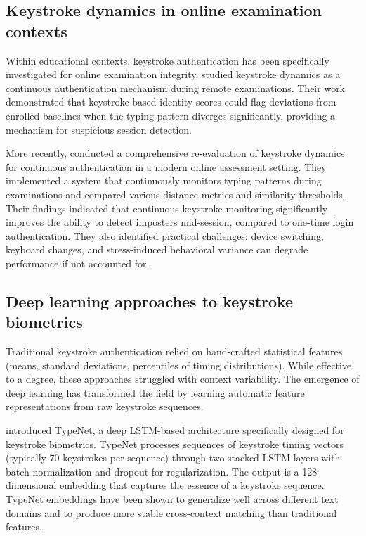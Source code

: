 \subsection{Keystroke dynamics in online examination contexts}

Within educational contexts, keystroke authentication has been specifically investigated for online examination integrity. \citet{mattsson2020keystroke} studied keystroke dynamics as a continuous authentication mechanism during remote examinations. Their work demonstrated that keystroke-based identity scores could flag deviations from enrolled baselines when the typing pattern diverges significantly, providing a mechanism for suspicious session detection.

More recently, \citet{senarath2023reevaluating} conducted a comprehensive re-evaluation of keystroke dynamics for continuous authentication in a modern online assessment setting. They implemented a system that continuously monitors typing patterns during examinations and compared various distance metrics and similarity thresholds. Their findings indicated that continuous keystroke monitoring significantly improves the ability to detect imposters mid-session, compared to one-time login authentication. They also identified practical challenges: device switching, keyboard changes, and stress-induced behavioral variance can degrade performance if not accounted for.

\subsection{Deep learning approaches to keystroke biometrics}

Traditional keystroke authentication relied on hand-crafted statistical features (means, standard deviations, percentiles of timing distributions). While effective to a degree, these approaches struggled with context variability. The emergence of deep learning has transformed the field by learning automatic feature representations from raw keystroke sequences.

\citet{acien2022typenet} introduced TypeNet, a deep LSTM-based architecture specifically designed for keystroke biometrics. TypeNet processes sequences of keystroke timing vectors (typically 70 keystrokes per sequence) through two stacked LSTM layers with batch normalization and dropout for regularization. The output is a 128-dimensional embedding that captures the essence of a keystroke sequence. TypeNet embeddings have been shown to generalize well across different text domains and to produce more stable cross-context matching than traditional features.

